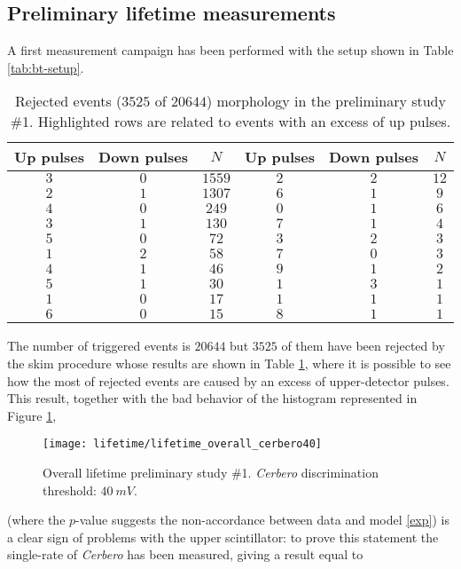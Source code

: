 \subsection{Preliminary lifetime measurements}
A first measurement campaign has been performed with the setup shown in Table \ref{tab:bt-setup}.
\begin{table}[!h]
	\centering
	\begin{tabular}{ccc||ccc}
		\toprule
		Up pulses & Down pulses & $N$ & Up pulses & Down pulses & $N$\\
		\midrule
		\rowcolor{blue!25}$3$&$0$&$1559$ & $2$&$2$&$12$\\
		\rowcolor{blue!25}$2$&$1$&$1307$ & $6$&$1$&$9$\\
		\cellcolor{blue!25}$4$&\cellcolor{blue!25}$0$&\cellcolor{blue!25}$249$ & $0$&$1$&$6$\\
		\rowcolor{blue!25}$3$&$1$&$130$ & $7$&$1$&$4$\\
		\rowcolor{blue!25}$5$&$0$&$72$ & $3$&$2$&$3$\\
		$1$&$2$&$58$ & \cellcolor{blue!25}$7$&\cellcolor{blue!25}$0$&\cellcolor{blue!25}$3$\\
		\rowcolor{blue!25}$4$&$1$&$46$ & $9$&$1$&$2$\\
		\cellcolor{blue!25}$5$&\cellcolor{blue!25}$1$&\cellcolor{blue!25}$30$ & $1$&$3$&$1$\\
		$1$&$0$&$17$ & 	$1$&$1$&$1$\\
		\rowcolor{blue!25}$6$&$0$&$15$ & $8$&$1$&$1$\\
		\bottomrule		
	\end{tabular}
	\caption{Rejected events ($3525$ of $20644$) morphology in the preliminary study \#1. Highlighted rows are related to events with an excess of up pulses.}\label{tab:skim1}
\end{table}
The number of triggered events is $20644$ but $3525$ of them have been rejected by the skim procedure whose results are shown in Table \ref{tab:skim1}, where it is possible to see how the most of rejected events are caused by an excess of upper-detector pulses. This result, together with the bad behavior of the histogram represented in Figure \ref{fig:lt1},
\begin{figure}[!htp]
	\centering
	\texttt{[image: lifetime/lifetime\_overall\_cerbero40]}
	\caption{Overall lifetime preliminary study \#1. \emph{Cerbero} discrimination threshold: $\SI{40}{mV}$.}\label{fig:lt1}
\end{figure}
(where the $p$-value suggests the non-accordance between data and model \eqref{exp}) is a clear sign of problems with the upper scintillator: to prove this statement the  single-rate of \emph{Cerbero} has been measured, giving a result equal to
